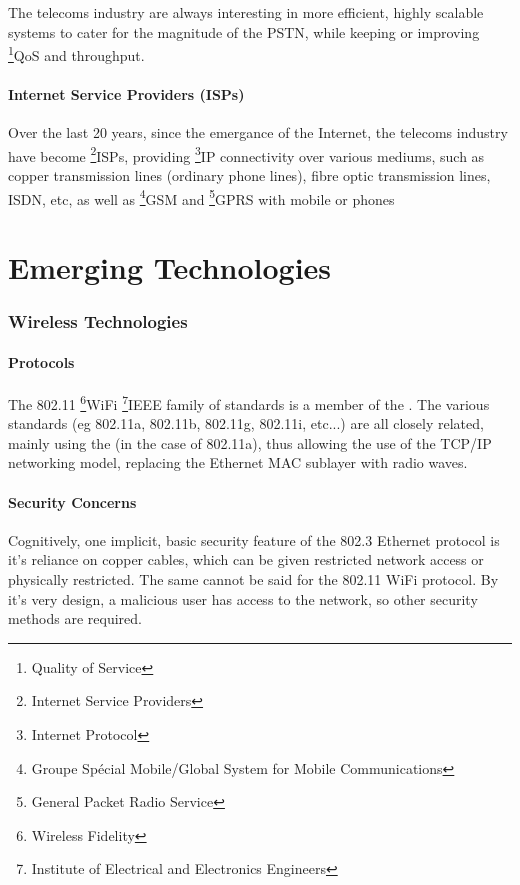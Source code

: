 \documentclass[a4paper,12pt]{article}
\begin{document}
The telecoms industry are always interesting in more efficient, highly
scalable systems to cater for the magnitude of the PSTN, while keeping
or improving \footnote{Quality of Service}{QoS} and throughput.

\subsection{Internet Service Providers (ISPs)}

Over the last 20 years, since the emergance of the Internet, the
telecoms industry have become \footnote{Internet Service
Providers}{ISPs}, providing \footnote{Internet Protocol}{IP}
connectivity over various mediums, such as copper transmission lines
(ordinary phone lines), fibre optic transmission lines, ISDN, etc, as
well as 
\footnote{Groupe Sp{\'e}cial Mobile/Global System for Mobile Communications}{GSM}
and 
\footnote{General Packet Radio Service}{GPRS} with mobile or
 phones

\part{Emerging Technologies}

\section{Wireless Technologies}

\subsection{Protocols}

The 802.11 \footnote{Wireless Fidelity}{WiFi} 
\footnote{Institute of Electrical and Electronics Engineers}{IEEE}
family of standards is a member of the 
\cite[\footnote{Media Access Control - The lower sublayer of the OSI Data Link
Layer}{MAC} sublayer]{tanenbaum}. The various standards (eg 802.11a, 802.11b, 
802.11g, 802.11i, etc...) are all closely related, mainly using the
\cite[2.4GHz or 5GHz]{wikipedia-80211} (in the case of 802.11a), thus
allowing the use of the TCP/IP networking model, replacing the Ethernet
MAC sublayer with radio waves. 

\subsection{Security Concerns}

Cognitively, one implicit, basic security feature of the 802.3 Ethernet protocol is it's
reliance on copper cables, which  can be given restricted network access
or physically restricted. The same cannot be said for the 802.11 WiFi
protocol. By it's very design, a malicious user has access to the
network, so other security methods are required.
\end{document}
